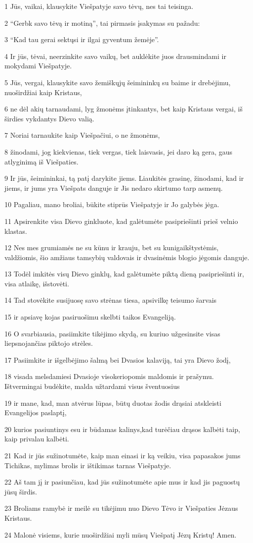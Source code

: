 \par 1 Jūs, vaikai, klausykite Viešpatyje savo tėvų, nes tai teisinga. 
\par 2 “Gerbk savo tėvą ir motiną”,­ tai pirmasis įsakymas su pažadu: 
\par 3 “Kad tau gerai sektųsi ir ilgai gyventum žemėje”. 
\par 4 Ir jūs, tėvai, neerzinkite savo vaikų, bet auklėkite juos drausmindami ir mokydami Viešpatyje. 
\par 5 Jūs, vergai, klausykite savo žemiškųjų šeimininkų su baime ir drebėjimu, nuoširdžiai kaip Kristaus, 
\par 6 ne dėl akių tarnaudami, lyg žmonėms įtinkantys, bet kaip Kristaus vergai, iš širdies vykdantys Dievo valią. 
\par 7 Noriai tarnaukite kaip Viešpačiui, o ne žmonėms, 
\par 8 žinodami, jog kiekvienas, tiek vergas, tiek laisvasis, jei daro ką gera, gaus atlyginimą iš Viešpaties. 
\par 9 Ir jūs, šeimininkai, tą patį darykite jiems. Liaukitės grasinę, žinodami, kad ir jiems, ir jums yra Viešpats danguje ir Jis nedaro skirtumo tarp asmenų. 
\par 10 Pagaliau, mano broliai, būkite stiprūs Viešpatyje ir Jo galybės jėga. 
\par 11 Apsirenkite visa Dievo ginkluote, kad galėtumėte pasipriešinti prieš velnio klastas. 
\par 12 Nes mes grumiamės ne su kūnu ir krauju, bet su kunigaikštystėmis, valdžiomis, šio amžiaus tamsybių valdovais ir dvasinėmis blogio jėgomis danguje. 
\par 13 Todėl imkitės visų Dievo ginklų, kad galėtumėte piktą dieną pasipriešinti ir, visa atlaikę, išstovėti. 
\par 14 Tad stovėkite susijuosę savo strėnas tiesa, apsivilkę teisumo šarvais 
\par 15 ir apsiavę kojas pasiruošimu skelbti taikos Evangeliją. 
\par 16 O svarbiausia, pasiimkite tikėjimo skydą, su kuriuo užgesinsite visas liepsnojančias piktojo strėles. 
\par 17 Pasiimkite ir išgelbėjimo šalmą bei Dvasios kalaviją, tai yra Dievo žodį, 
\par 18 visada melsdamiesi Dvasioje visokeriopomis maldomis ir prašymu. Ištvermingai budėkite, malda užtardami visus šventuosius 
\par 19 ir mane, kad, man atvėrus lūpas, būtų duotas žodis drąsiai atskleisti Evangelijos paslaptį, 
\par 20 kurios pasiuntinys esu ir būdamas kalinys,­kad turėčiau drąsos kalbėti taip, kaip privalau kalbėti. 
\par 21 Kad ir jūs sužinotumėte, kaip man einasi ir ką veikiu, visa papasakos jums Tichikas, mylimas brolis ir ištikimas tarnas Viešpatyje. 
\par 22 Aš tam jį ir pasiunčiau, kad jūs sužinotumėte apie mus ir kad jis paguostų jūsų širdis. 
\par 23 Broliams ramybė ir meilė su tikėjimu nuo Dievo Tėvo ir Viešpaties Jėzaus Kristaus. 
\par 24 Malonė visiems, kurie nuoširdžiai myli mūsų Viešpatį Jėzų Kristų! Amen.


